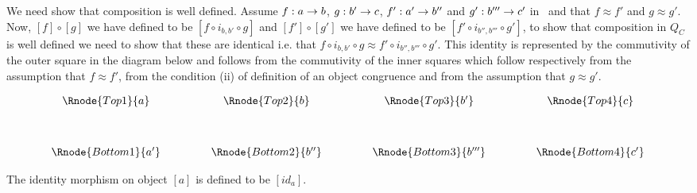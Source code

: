 \documentclass[10pt,a4paper]{article}
\theoremstyle{remark}
\newcommand{\catcw}{\cat{C}\ }
\begin{document}
We need show that composition is well defined.  Assume $f:a \rightarrow b$, $g: b' \rightarrow c$, $f':a' \rightarrow b''$ and $g': b''' \rightarrow c'$ in \catcw and that
$f \approx f'$ and $g \approx g'$.
Now,  
$[f] \circ [g]$ we have defined to be $[f \circ i_{b,b'} \circ g]$  and $[f']  \circ [g']$ we have defined to be $[f' \circ i_{b'',b'''} \circ g']$,
to show that composition in $Q_C$ is well defined we need to show that these are identical i.e. that $f \circ i_{b,b'} \circ g \approx f' \circ i_{b'',b'''} \circ g'$. This identity
is represented by the commutivity of the outer square in the diagram below and follows from the commutivity of the inner squares which follow respectively from the assumption that $f \approx f'$,
from the condition (ii) of definition of an object congruence and from the assumption that $g \approx g'$.

\vspace{3mm}
\begin{center}
\begin{displaymath}
\begin{array}{cp{.9cm}cp{.9cm}cp{.9cm}c}
\Rnode{Top1}{a} & & \Rnode{Top2}{b}  & & \Rnode{Top3}{b'} && \Rnode{Top4}{c}\\ [1.2cm]
\Rnode{Bottom1}{a'} & & \Rnode{Bottom2}{b''}  & & \Rnode{Bottom3}{b'''} && \Rnode{Bottom4}{c'}
\end{array}
\end{displaymath}
\end{center}


The identity morphism on object $[a]$ is defined to be $[id_a]$.
\end{document}
